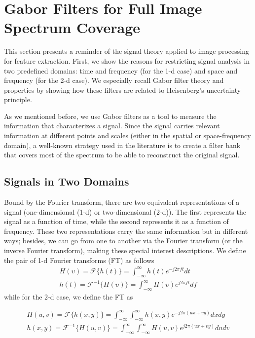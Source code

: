 \documentclass[journal]{IEEEtran}
\begin{document}
\section{Gabor Filters for Full Image Spectrum Coverage}

This section presents a reminder of the signal theory applied to image processing for feature extraction. First, we show the reasons for restricting signal analysis in two predefined domains: time and frequency (for the 1-d case) and space and frequency (for the 2-d case). We especially recall Gabor filter theory and properties by showing how these filters are related to Heisenberg's uncertainty principle.

As we mentioned before, we use Gabor filters as a tool to measure the information that characterizes a signal. Since the signal carries relevant information at different points and scales (either in the spatial or space-frequency domain), a well-known strategy used in the literature is to create a filter bank that covers most of the spectrum to be able to reconstruct the original signal.

\subsection{Signals in Two Domains}
Bound by the Fourier transform, there are two equivalent representations of a signal (one-dimensional (1-d) or two-dimensional (2-d)). The first represents the signal as a function of time, while the second represents it as a function of frequency. These two representations carry the same information but in different ways; besides, we can go from one to another via the Fourier transform (or the inverse Fourier transform), making these special interest descriptions. We define the pair of 1-d Fourier transforms (FT) as follows
\begin{equation}\label{eq:fourier_transforms_1d}
    \begin{gathered}
        H(\upsilon) = \mathcal{F}\{h(t)\} = \int_{-\infty}^{\infty} h(t) e^{-j2\pi f t} dt \\
        h(t) = \mathcal{F}^{-1}\{H(\upsilon)\} = \int_{-\infty}^{\infty} H(\upsilon) e^{j2\pi f t} df 
    \end{gathered}
\end{equation}
while for the 2-d case, we define the FT as

\begin{equation}\label{eq:fourier_transforms_2d}
    \begin{gathered}
        H(u, v) = \mathcal{F}\{h(x, y)\} = \int_{-\infty}^{\infty} \int_{-\infty}^{\infty} h(x, y) e^{-j2\pi (ux + vy)} dx dy \\
        h(x, y) = \mathcal{F}^{-1}\{H(u, v)\} = \int_{-\infty}^{\infty} \int_{-\infty}^{\infty}  H(u, v) e^{j2\pi (ux + vy)} du dv 
    \end{gathered}
\end{equation}
\end{document}
